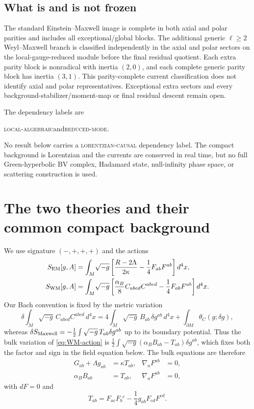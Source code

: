 \documentclass[11pt]{article}
\theoremstyle{remark}
\begin{document}
\subsection{What is and is not frozen}
The standard Einstein--Maxwell image is complete in both axial and polar
parities and includes all exceptional/global blocks. The additional generic
$\ell\geq2$ Weyl--Maxwell branch is classified independently in the axial and
polar sectors on the local-gauge-reduced module before the final residual
quotient. Each extra parity block is nonradical with inertia $(2,0)$, and each
complete generic parity block has inertia $(3,1)$. This parity-complete
current classification does not identify axial and polar representatives.
Exceptional extra sectors and every background-stabilizer/moment-map or final
residual descent remain open.

The dependency labels are
\begin{center}
\textsc{local-algebraic}\quad and\quad \textsc{reduced-mode}.
\end{center}
No result below carries a \textsc{lorentzian-causal} dependency label. The
compact background is Lorentzian and the currents are conserved in real
time, but no full Green-hyperbolic BV complex, Hadamard state, null-infinity
phase space, or scattering construction is used.

\section{The two theories and their common compact background}
\label{sec:background}

We use signature $(-,+,+,+)$ and the actions
\begin{align}
 S_{\rm EM}[g,A]
 &=\int_M\!\sqrt{-g}\left[
 \frac{R-2\Lambda}{2\kappa}-\frac14F_{ab}F^{ab}\right]d^4x,
 \label{eq:EM-action}\\
S_{\rm WM}[g,A]
&=\int_M\!\sqrt{-g}\left[
\frac{\alpha_B}{8}C_{abcd}C^{abcd}-\frac14F_{ab}F^{ab}\right]d^4x .
\label{eq:WM-action}
\end{align}
Our Bach convention is fixed by the metric variation
\begin{equation}\label{eq:bach-variation}
 \delta\!\int_M\sqrt{-g}\,C_{abcd}C^{abcd}\,d^4x
 =4\int_M\sqrt{-g}\,B_{ab}\,\delta g^{ab}\,d^4x
 +\int_{\partial M}\theta_C(g;\delta g),
\end{equation}
whereas
$\delta S_{\rm Maxwell}=-\frac12\int\sqrt{-g}\,T_{ab}\delta g^{ab}$
up to its boundary potential. Thus the bulk variation of
\eqref{eq:WM-action} is
$\frac12\int\sqrt{-g}(\alpha_BB_{ab}-T_{ab})\delta g^{ab}$, which fixes both
the factor and sign in the field equation below. The bulk equations are
therefore
\begin{align}
 G_{ab}+\Lambda g_{ab}&=\kappa T_{ab},
 &\nabla_aF^{ab}&=0,\label{eq:EM-eom}\\
 \alpha_B B_{ab}&=T_{ab},
 &\nabla_aF^{ab}&=0,\label{eq:WM-eom}
\end{align}
with $dF=0$ and
\begin{equation}
 T_{ab}=F_{ac}F_b{}^c-\frac14g_{ab}F_{cd}F^{cd}.
\end{equation}
\end{document}

